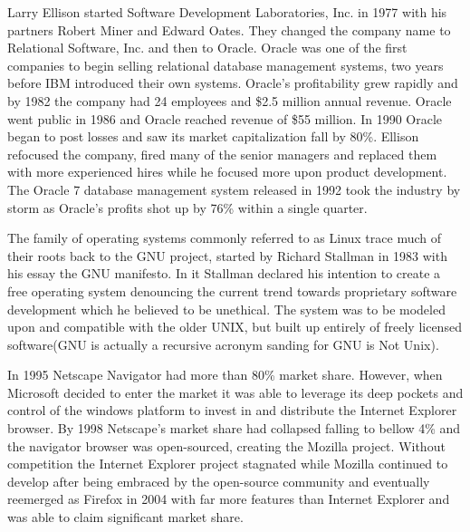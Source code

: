 Larry Ellison started Software Development Laboratories, Inc. in 1977 with his partners Robert Miner and Edward Oates.\autocite[113]{finkle2012larry}
They changed the company name to Relational Software, Inc. and then to Oracle.\autocite[113]{finkle2012larry}
Oracle was one of the first companies to begin selling relational database management systems, two years before IBM introduced their own systems.\autocite[113]{finkle2012larry}
Oracle's profitability grew rapidly and by 1982 the company had 24 employees and \$2.5 million annual revenue.\autocite[113]{finkle2012larry}
Oracle went public in 1986 and Oracle reached revenue of \$55 million.\autocite[113]{finkle2012larry}
In 1990 Oracle began to post losses and saw its market capitalization fall by 80\%.\autocite[113]{finkle2012larry}
Ellison refocused the company, fired many of the senior managers and replaced them with more experienced hires while he focused more upon product development.\autocite[113]{finkle2012larry}
The Oracle 7 database management system released in 1992 took the industry by storm as Oracle's profits shot up by 76\% within a single quarter.\autocite[114]{finkle2012larry}

The family of operating systems commonly referred to as Linux trace much of their roots back to the GNU project, started by Richard Stallman in 1983 with his essay the GNU manifesto.\autocite[]{GNUManifesto}
In it Stallman declared his intention to create a free operating system denouncing the current trend towards proprietary software development which he believed to be unethical.\autocite[]{GNUManifesto}
The system was to be modeled upon and compatible with the older UNIX, but built up entirely of freely licensed software(GNU is actually a recursive acronym sanding for GNU is Not Unix).\autocite[]{GNUManifesto}

In 1995 Netscape Navigator had more than 80\% market share. However, when Microsoft decided to enter the market it was able to leverage its deep pockets and control of the windows platform to invest in and distribute the Internet Explorer browser.\autocite[27]{buxmann2012software}
By 1998 Netscape's market share had collapsed falling to bellow 4\% and the navigator browser was open-sourced, creating the Mozilla project.\autocite[27]{buxmann2012software}
Without competition the Internet Explorer project stagnated while Mozilla continued to develop after being embraced by the open-source community and eventually reemerged as Firefox in 2004 with far more features than Internet Explorer and was able to claim significant market share.\autocite[27]{buxmann2012software}

